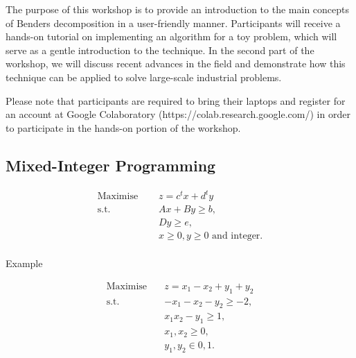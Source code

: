 The purpose of this workshop is to provide an introduction to the main concepts of Benders decomposition in a user-friendly manner. Participants will receive a hands-on tutorial on implementing an algorithm for a toy problem, which will serve as a gentle introduction to the technique. In the second part of the workshop, we will discuss recent advances in the field and demonstrate how this technique can be applied to solve large-scale industrial problems.

Please note that participants are required to bring their laptops and register for an account at Google Colaboratory (https://colab.research.google.com/) in order to participate in the hands-on portion of the workshop.

\vfill

\newpage





\subsection*{Mixed-Integer Programming}


\begin{align*}
\textrm{Maximise } \quad & z = c^tx + d^ty \\
\textrm{s.t.} \quad & Ax + By \geq b, \\
& Dy \geq e, \\
& x {\geq 0},  y {\geq 0} \textrm{ and integer}.\\
\end{align*}




\begin{bclogo}[logo=\bccrayon]{\small Example }
\vspace{.2cm} \small

\begin{align*}
\textrm{Maximise} \quad & z = x_1 - x_2 + y_1 + y_2 \\
\textrm{s.t.} \quad & -x_1 - x_2 - y_2 \geq -2, \\
& x_1  x_2 - y_1 \geq 1, \\
& x_1, x_2 \geq 0, \\
& y_1, y_2 \in {0,1}.
\end{align*}



\vspace{.2cm}
\end{bclogo}
\vspace{1cm}

